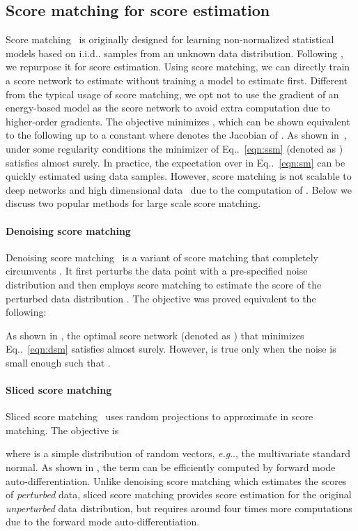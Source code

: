 \documentclass{article}
\makeatletter
\def\@onedot{\ifx\@let@token.\else.\null\fi\xspace}
\DeclareRobustCommand\onedot{\futurelet\@let@token\@onedot}
\newcommand{\eqnref}[1]{Eq\onedot~\eqref{#1}}
\def\eg{\emph{e.g}\onedot}
\def\iid{i.i.d\onedot}
\makeatother
\begin{document}
\subsection{Score matching for score estimation}\label{sec:sm}
Score matching~\cite{hyvarinen2005estimation} is originally designed for learning non-normalized statistical models based on \iid samples from an unknown data distribution. Following \cite{song2019ssm}, we repurpose it for score estimation. Using score matching, we can directly train a score network  to estimate  without training a model to estimate  first. Different from the typical usage of score matching, we opt not to use the gradient of an energy-based model as the score network to avoid extra computation due to higher-order gradients. The objective minimizes , which can be shown equivalent to the following up to a constant 
where  denotes the Jacobian of . As shown in~\cite{song2019ssm}, under some regularity conditions the minimizer of \eqnref{eqn:ssm} (denoted as ) satisfies  almost surely. In practice, the expectation over  in \eqnref{eqn:sm} can be quickly estimated using data samples. However, score matching is not scalable to deep networks and high dimensional data~\cite{song2019ssm} due to the computation of . Below we discuss two popular methods for large scale score matching.

\paragraph{Denoising score matching} Denoising score matching~\cite{vincent2011connection} is a variant of score matching that completely circumvents . It first perturbs the data point  with a pre-specified noise distribution  and then employs score matching to estimate the score of the perturbed data distribution . The objective was proved equivalent to the following:

As shown in \cite{vincent2011connection}, the optimal score network (denoted as ) that minimizes \eqnref{eqn:dsm} satisfies  almost surely. However,  is true only when the noise is small enough such that .

\paragraph{Sliced score matching}
Sliced score matching~\cite{song2019ssm} uses random projections to approximate  in score matching. The objective is

where  is a simple distribution of random vectors, \eg, the multivariate standard normal. As shown in \cite{song2019ssm}, the term  can be efficiently computed by forward mode auto-differentiation. Unlike denoising score matching which estimates the scores of \emph{perturbed} data, sliced score matching provides score estimation for the original \emph{unperturbed} data distribution, but requires around four times more computations due to the forward mode auto-differentiation.
\end{document}
